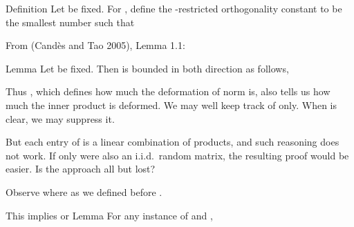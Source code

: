 \stopsubsection

\startsubsection [title={Suffice It to Ignore DFT Matrix}]

\Result
{Definition}
{
Let  be fixed.
For , define the -restricted orthogonality constant  to be the smallest number such that
}

From  (Cand\`es and Tao 2005), Lemma 1.1:

\Result
{Lemma}
{
Let  be fixed.
Then  is bounded in both direction as follows,
}

Thus , which defines how much the deformation of norm is, also tells us how much the inner product is deformed.
We may well keep track of  only.
When  is clear, we may suppress it.

But each entry of  is a linear combination of products, and such reasoning does not work.
If only  were also an i.i.d.\ random matrix, the resulting proof would be easier.
Is the approach all but lost?

Observe
where as we defined before .

This implies
or
\Result
{Lemma}
{
For any instance of  and ,
}

